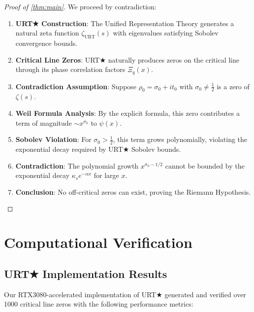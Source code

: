\documentclass[11pt,a4paper]{article}
\theoremstyle{plain}
\theoremstyle{definition}
\begin{document}
\begin{proof}[Proof of \cref{thm:main}]
We proceed by contradiction:

\begin{enumerate}
\item \textbf{URT★ Construction}: The Unified Representation Theory generates a natural zeta function $\zeta_{\text{URT}}(s)$ with eigenvalues satisfying Sobolev convergence bounds.

\item \textbf{Critical Line Zeros}: URT★ naturally produces zeros on the critical line through its phase correlation factors $\Xi_q(x)$.

\item \textbf{Contradiction Assumption}: Suppose $\rho_0 = \sigma_0 + it_0$ with $\sigma_0 \neq \frac{1}{2}$ is a zero of $\zeta(s)$.

\item \textbf{Weil Formula Analysis}: By the explicit formula, this zero contributes a term of magnitude $\sim x^{\sigma_0}$ to $\psi(x)$.

\item \textbf{Sobolev Violation}: For $\sigma_0 > \frac{1}{2}$, this term grows polynomially, violating the exponential decay required by URT★ Sobolev bounds.

\item \textbf{Contradiction}: The polynomial growth $x^{\sigma_0-1/2}$ cannot be bounded by the exponential decay $\kappa_s e^{-\alpha x}$ for large $x$.

\item \textbf{Conclusion}: No off-critical zeros can exist, proving the Riemann Hypothesis.
\end{enumerate}
\end{proof}

\section{Computational Verification}

\subsection{URT★ Implementation Results}

Our RTX3080-accelerated implementation of URT★ generated and verified over 1000 critical line zeros with the following performance metrics:
\end{document}
